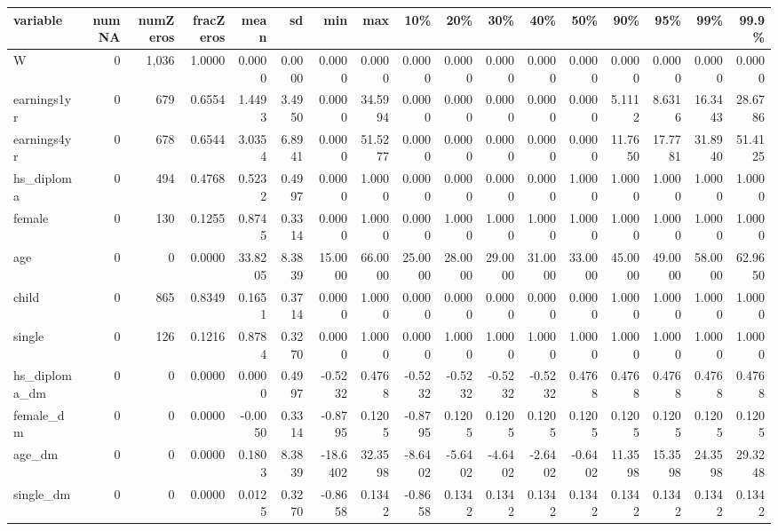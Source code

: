 
\begin{tabular}{lrrrrrrrrrrrrrrrr}
\toprule
variable & numNA & numZeros & fracZeros & mean & sd & min & max & 10\% & 20\% & 30\% & 40\% & 50\% & 90\% & 95\% & 99\% & 99.9\%\\
\midrule
W & 0 & 1,036 & 1.0000 & 0.0000 & 0.0000 & 0.0000 & 0.0000 & 0.0000 & 0.0000 & 0.0000 & 0.0000 & 0.0000 & 0.0000 & 0.0000 & 0.0000 & 0.0000\\
earnings1yr & 0 & 679 & 0.6554 & 1.4493 & 3.4950 & 0.0000 & 34.5994 & 0.0000 & 0.0000 & 0.0000 & 0.0000 & 0.0000 & 5.1112 & 8.6316 & 16.3443 & 28.6786\\
earnings4yr & 0 & 678 & 0.6544 & 3.0354 & 6.8941 & 0.0000 & 51.5277 & 0.0000 & 0.0000 & 0.0000 & 0.0000 & 0.0000 & 11.7650 & 17.7781 & 31.8940 & 51.4125\\
hs\_diploma & 0 & 494 & 0.4768 & 0.5232 & 0.4997 & 0.0000 & 1.0000 & 0.0000 & 0.0000 & 0.0000 & 0.0000 & 1.0000 & 1.0000 & 1.0000 & 1.0000 & 1.0000\\
female & 0 & 130 & 0.1255 & 0.8745 & 0.3314 & 0.0000 & 1.0000 & 0.0000 & 1.0000 & 1.0000 & 1.0000 & 1.0000 & 1.0000 & 1.0000 & 1.0000 & 1.0000\\
\addlinespace
age & 0 & 0 & 0.0000 & 33.8205 & 8.3839 & 15.0000 & 66.0000 & 25.0000 & 28.0000 & 29.0000 & 31.0000 & 33.0000 & 45.0000 & 49.0000 & 58.0000 & 62.9650\\
child & 0 & 865 & 0.8349 & 0.1651 & 0.3714 & 0.0000 & 1.0000 & 0.0000 & 0.0000 & 0.0000 & 0.0000 & 0.0000 & 1.0000 & 1.0000 & 1.0000 & 1.0000\\
single & 0 & 126 & 0.1216 & 0.8784 & 0.3270 & 0.0000 & 1.0000 & 0.0000 & 1.0000 & 1.0000 & 1.0000 & 1.0000 & 1.0000 & 1.0000 & 1.0000 & 1.0000\\
hs\_diploma\_dm & 0 & 0 & 0.0000 & 0.0000 & 0.4997 & -0.5232 & 0.4768 & -0.5232 & -0.5232 & -0.5232 & -0.5232 & 0.4768 & 0.4768 & 0.4768 & 0.4768 & 0.4768\\
female\_dm & 0 & 0 & 0.0000 & -0.0050 & 0.3314 & -0.8795 & 0.1205 & -0.8795 & 0.1205 & 0.1205 & 0.1205 & 0.1205 & 0.1205 & 0.1205 & 0.1205 & 0.1205\\
\addlinespace
age\_dm & 0 & 0 & 0.0000 & 0.1803 & 8.3839 & -18.6402 & 32.3598 & -8.6402 & -5.6402 & -4.6402 & -2.6402 & -0.6402 & 11.3598 & 15.3598 & 24.3598 & 29.3248\\
single\_dm & 0 & 0 & 0.0000 & 0.0125 & 0.3270 & -0.8658 & 0.1342 & -0.8658 & 0.1342 & 0.1342 & 0.1342 & 0.1342 & 0.1342 & 0.1342 & 0.1342 & 0.1342\\
\bottomrule
\end{tabular}
